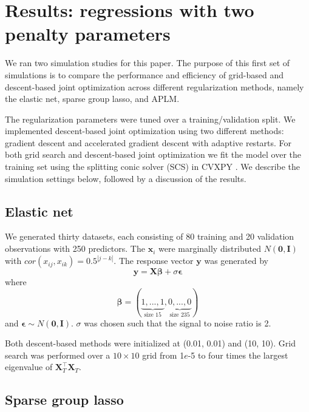 \documentclass[12pt,letterpaper]{article}
\begin{document}
\section{Results: regressions with two penalty parameters}\label{sec:results1}\label{results1}

We ran two simulation studies for this paper. The purpose of this first set of simulations is to compare the performance and efficiency of grid-based and descent-based joint optimization across different regularization methods, namely the elastic net, sparse group lasso, and APLM.

The regularization parameters were tuned over a training/validation split. We implemented descent-based joint optimization using two different methods:  gradient descent and accelerated gradient descent with adaptive restarts. For both grid search and descent-based joint optimization we fit the model over the training set using the splitting conic solver (SCS) in CVXPY \citep{cvxpy}. We describe the simulation settings below, followed by a discussion of the results.

\subsection{Elastic net}
We generated thirty datasets, each consisting of 80 training and 20 validation observations with 250 predictors. The $\boldsymbol x_i$ were marginally distributed $N(\boldsymbol 0,\boldsymbol I)$ with $cor(x_{ij},x_{ik}) = 0.5^{|j-k|}$.
The response vector $\boldsymbol y$ was generated by
\begin{equation}
\boldsymbol y = \boldsymbol X \boldsymbol \beta + \sigma \boldsymbol \epsilon
\end{equation}
where
\begin{equation}
\boldsymbol \beta = (\underbrace{1, ..., 1}_\text{size 15}, \underbrace{0, ..., 0}_\text{size 235})
\end{equation}
and $\boldsymbol \epsilon \sim N(\boldsymbol 0, \boldsymbol I)$. $\sigma$ was chosen such that the signal to noise ratio is 2. 

Both descent-based methods were initialized at (0.01, 0.01) and (10, 10). Grid search was performed over a $10 \times 10$ grid from 1$e$-5 to four times the largest eigenvalue of $\boldsymbol X_T^\top \boldsymbol X_T$.

\subsection{Sparse group lasso}\label{sec:simulationSGL}
\end{document}
